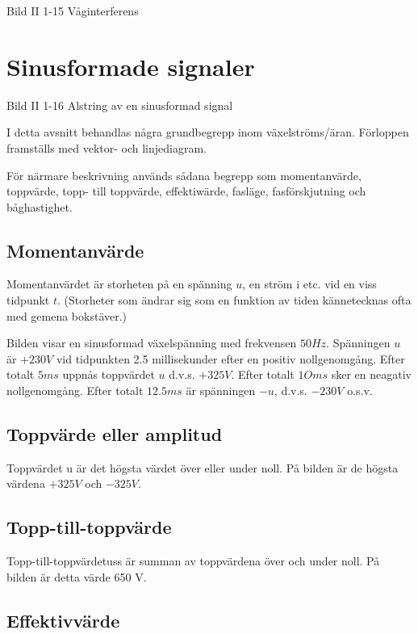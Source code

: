 \documentclass[a4paper,twoside,twocolumn,openright]{book}
\begin{document}
Bild II 1-15 Våginterferens

\cleardoublepage

\section{Sinusformade signaler}

Bild II 1-16 Alstring av en sinusformad signal

I detta avsnitt behandlas några grundbegrepp inom växelströms/äran. Förloppen
framställs med vektor- och linjediagram.

För närmare beskrivning används sådana begrepp som momentanvärde, toppvärde, topp- till
toppvärde, effektiwärde, fasläge, fasförskjutning och båghastighet.

\subsection{Momentanvärde}

Momentanvärdet är storheten på en spänning $u$, en ström i etc. vid en viss tidpunkt $t$.
(Storheter som ändrar sig som en funktion av tiden kännetecknas ofta med gemena bokstäver.)

Bilden visar en sinusformad växelspänning med frekvensen $50 Hz$. Spänningen $u$ är $+230 V$ vid tidpunkten 2.5 millisekunder efter en positiv nollgenomgång. Efter totalt $5 ms$
uppnås toppvärdet $u$ d.v.s. $+325 V$. Efter totalt $1O ms$ sker en neagativ
nollgenomgång. Efter totalt $12.5 ms$ är spänningen $-u$, d.v.s. $-230 V$ o.s.v.

\subsection{Toppvärde eller amplitud}

Toppvärdet u är det högsta värdet över eller under noll. På bilden är de högsta
värdena $+325 V$ och $-325 V$.

\subsection{Topp-till-toppvärde}

Topp-till-toppvärdetuss är summan av toppvärdena över och under noll. På bilden är
detta värde 650 V.

\subsection{Effektivvärde}
\end{document}
